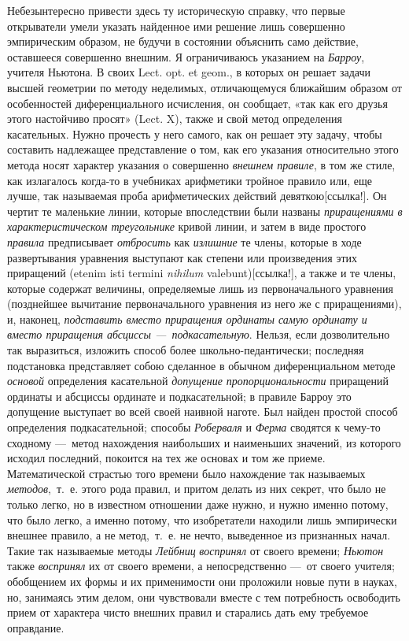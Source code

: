 {Небезынтересно привести здесь ту историческую справку, что первые
открыватели умели указать найденное ими решение лишь совершенно
эмпирическим образом, не будучи в состоянии объяснить само действие,
оставшееся совершенно внешним. Я ограничиваюсь указанием на
{\em Барроу}, учителя Ньютона. В своих Lect. opt. et
geom., в которых он решает задачи высшей геометрии по методу неделимых,
отличающемуся ближайшим образом от особенностей диференциального
исчисления, он сообщает, «так как его друзья этого настойчиво просят»
(Lect. X), также и свой метод определения касательных. Нужно прочесть у
него самого, как он решает эту задачу, чтобы составить надлежащее
представление о том, как его указания относительно этого метода носят
характер указания о совершенно {\em внешнем правиле}, в
том же стиле, как излагалось когда-то в учебниках арифметики тройное
правило или, еще лучше, так называемая проба арифметических действий
девяткою[ссылка!]. Он чертит те
маленькие линии, которые впоследствии были названы
{\em приращениями в характеристическом треугольнике}
кривой линии, и затем в виде простого {\em правила}
предписывает {\em отбросить} как
{\em излишние} те члены, которые в ходе развертывания
уравнения выступают как степени или произведения этих приращений (etenim
isti termini {\em nihilum} valebunt)[ссылка!], а также и те члены,
которые содержат величины, определяемые лишь из первоначального уравнения
(позднейшее вычитание первоначального уравнения из него же с приращениями),
и, наконец, {\em подставить вместо приращения ординаты
самую ординату и вместо приращения абсциссы —~подкасательную}. Нельзя, если
дозволительно так выразиться, изложить способ более школьно-педантически;
последняя подстановка представляет собою сделанное в обычном
диференциальном методе {\em основой} определения
касательной {\em допущение пропорциональности}
приращений ординаты и абсциссы ординате и подкасательной; в правиле Барроу
это допущение выступает во всей своей наивной наготе. Был найден простой
способ определения подкасательной; способы
{\em Роберваля} и {\em Ферма}
сводятся к чему-то сходному —~метод нахождения наибольших и наименьших
значений, из которого исходил последний, покоится на тех же основах и том
же приеме. Математической страстью того времени было нахождение так
называемых {\em методов},~т.~е. этого рода правил, и
притом делать из них секрет, что было не только легко, но в известном
отношении даже нужно, и нужно именно потому, что было легко, а именно
потому, что изобретатели находили лишь эмпирически внешнее правило, а не
метод,~т.~е. не нечто, выведенное из признанных начал. Такие так называемые
методы {\em Лейбниц}
{\em воспринял} от своего времени;
{\em Ньютон} также {\em воспринял}
их от своего времени, а непосредственно —~от своего учителя; обобщением их
формы и их применимости они проложили новые пути в науках, но, занимаясь
этим делом, они чувствовали вместе с тем потребность освободить прием от
характера чисто внешних правил и старались дать ему требуемое оправдание.

}
